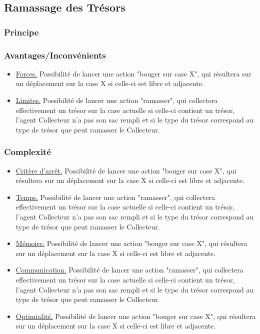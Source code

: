 \documentclass[a4paper, 10pt]{article}
\begin{document}
\subsection{Ramassage des Trésors}

\subsubsection{Principe}

\blindtext

\subsubsection{Avantages/Inconvénients}

\begin{itemize}
            \item \underline{Forces.} Possibilité de lancer une action "bouger sur case X", qui résultera sur un déplacement sur la case {X} si celle-ci est libre et adjacente.
            \item \underline{Limites.} Possibilité de lancer une action "ramasser", qui collectera effectivement un trésor sur la case actuelle si celle-ci contient un trésor, l'agent Collecteur n'a pas son sac rempli et si le type du trésor correspond au type de trésor que peut ramasser le Collecteur.
\end{itemize}


\subsubsection{Complexité}

\begin{itemize}
            \item \underline{Critère d'arrêt.} Possibilité de lancer une action "bouger sur case X", qui résultera sur un déplacement sur la case {X} si celle-ci est libre et adjacente.
            \item \underline{Temps.} Possibilité de lancer une action "ramasser", qui collectera effectivement un trésor sur la case actuelle si celle-ci contient un trésor, l'agent Collecteur n'a pas son sac rempli et si le type du trésor correspond au type de trésor que peut ramasser le Collecteur.
            \item \underline{Mémoire.} Possibilité de lancer une action "bouger sur case X", qui résultera sur un déplacement sur la case {X} si celle-ci est libre et adjacente.
            \item \underline{Communication.} Possibilité de lancer une action "ramasser", qui collectera effectivement un trésor sur la case actuelle si celle-ci contient un trésor, l'agent Collecteur n'a pas son sac rempli et si le type du trésor correspond au type de trésor que peut ramasser le Collecteur.
            \item \underline{Optimialité.} Possibilité de lancer une action "bouger sur case X", qui résultera sur un déplacement sur la case {X} si celle-ci est libre et adjacente.
\end{itemize}
\end{document}
